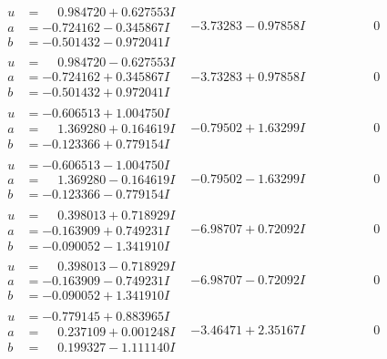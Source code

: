 \documentclass[1p]{elsarticle_modified}
\theoremstyle{definition}
\begin{document}
$$\begin{array}{c|c|c}
\begin{aligned}
u &= \phantom{-}0.984720 + 0.627553 I \\
a &= -0.724162 - 0.345867 I \\
b &= -0.501432 - 0.972041 I\end{aligned}
 & -3.73283 - 0.97858 I & \phantom{-0.000000 } 0 \\ \hline\begin{aligned}
u &= \phantom{-}0.984720 - 0.627553 I \\
a &= -0.724162 + 0.345867 I \\
b &= -0.501432 + 0.972041 I\end{aligned}
 & -3.73283 + 0.97858 I & \phantom{-0.000000 } 0 \\ \hline\begin{aligned}
u &= -0.606513 + 1.004750 I \\
a &= \phantom{-}1.369280 + 0.164619 I \\
b &= -0.123366 + 0.779154 I\end{aligned}
 & -0.79502 + 1.63299 I & \phantom{-0.000000 } 0 \\ \hline\begin{aligned}
u &= -0.606513 - 1.004750 I \\
a &= \phantom{-}1.369280 - 0.164619 I \\
b &= -0.123366 - 0.779154 I\end{aligned}
 & -0.79502 - 1.63299 I & \phantom{-0.000000 } 0 \\ \hline\begin{aligned}
u &= \phantom{-}0.398013 + 0.718929 I \\
a &= -0.163909 + 0.749231 I \\
b &= -0.090052 - 1.341910 I\end{aligned}
 & -6.98707 + 0.72092 I & \phantom{-0.000000 } 0 \\ \hline\begin{aligned}
u &= \phantom{-}0.398013 - 0.718929 I \\
a &= -0.163909 - 0.749231 I \\
b &= -0.090052 + 1.341910 I\end{aligned}
 & -6.98707 - 0.72092 I & \phantom{-0.000000 } 0 \\ \hline\begin{aligned}
u &= -0.779145 + 0.883965 I \\
a &= \phantom{-}0.237109 + 0.001248 I \\
b &= \phantom{-}0.199327 - 1.111140 I\end{aligned}
 & -3.46471 + 2.35167 I & \phantom{-0.000000 } 0 \\ \hline\begin{aligned}

\end{aligned}
\end{array}$$
\end{document}
